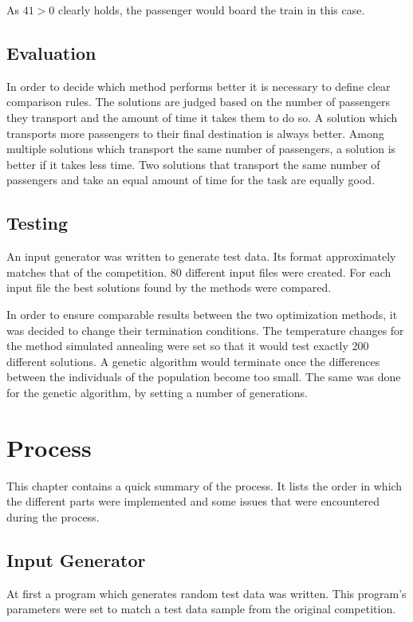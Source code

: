 \documentclass[10pt]{scrreprt}
\begin{document}
As $41 > 0$ clearly holds, the passenger would board the train in this case.

\section{Evaluation}
In order to decide which method performs better it is necessary to define clear comparison rules. The solutions are judged based on the number of passengers they transport and the amount of time it takes them to do so. A solution which transports more passengers to their final destination is always better. Among multiple solutions which transport the same number of passengers, a solution is better if it takes less time. Two solutions that transport the same number of passengers and take an equal amount of time for the task are equally good.


\section{Testing}

An input generator was written to generate test data. Its format approximately matches that of the competition. 80 different input files were created. For each input file the best solutions found by the methods were compared.

In order to ensure comparable results between the two optimization methods, it was decided to change their termination conditions. The temperature changes for the method simulated annealing were set so that it would test exactly 200 different solutions. A genetic algorithm would terminate once the differences between the individuals of the population become too small. The same was done for the genetic algorithm, by setting a number of generations.

\chapter{Process}

This chapter contains a quick summary of the process. It lists the order in which the different parts were implemented and some issues that were encountered during the process.

\section{Input Generator}
At first a program which generates random test data was written. This program’s parameters were set to match a test data sample from the original competition.
\end{document}
